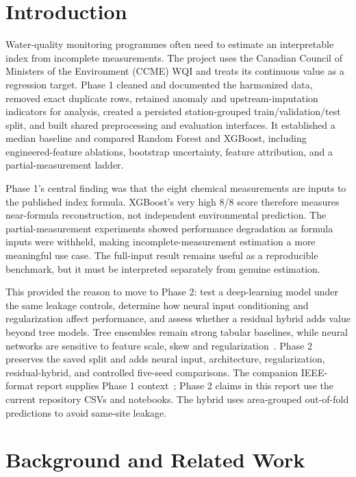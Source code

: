 \documentclass[conference]{IEEEtran}
\begin{document}
\section{Introduction}
Water-quality monitoring programmes often need to estimate an interpretable index from incomplete measurements. The project uses the Canadian Council of Ministers of the Environment (CCME) WQI and treats its continuous value as a regression target. Phase 1 cleaned and documented the harmonized data, removed exact duplicate rows, retained anomaly and upstream-imputation indicators for analysis, created a persisted station-grouped train/validation/test split, and built shared preprocessing and evaluation interfaces. It established a median baseline and compared Random Forest and XGBoost, including engineered-feature ablations, bootstrap uncertainty, feature attribution, and a partial-measurement ladder.

Phase 1's central finding was that the eight chemical measurements are inputs to the published index formula. XGBoost's very high 8/8 score therefore measures near-formula reconstruction, not independent environmental prediction. The partial-measurement experiments showed performance degradation as formula inputs were withheld, making incomplete-measurement estimation a more meaningful use case. The full-input result remains useful as a reproducible benchmark, but it must be interpreted separately from genuine estimation.

This provided the reason to move to Phase 2: test a deep-learning model under the same leakage controls, determine how neural input conditioning and regularization affect performance, and assess whether a residual hybrid adds value beyond tree models. Tree ensembles remain strong tabular baselines, while neural networks are sensitive to feature scale, skew and regularization~\cite{grinsztajn2022why,gorishniy2021revisiting,kadra2021well}. Phase 2 preserves the saved split and adds neural input, architecture, regularization, residual-hybrid, and controlled five-seed comparisons. The companion IEEE-format report supplies Phase 1 context~\cite{phase2companion}; Phase 2 claims in this report use the current repository CSVs and notebooks. The hybrid uses area-grouped out-of-fold predictions to avoid same-site leakage.

\section{Background and Related Work}
\end{document}
